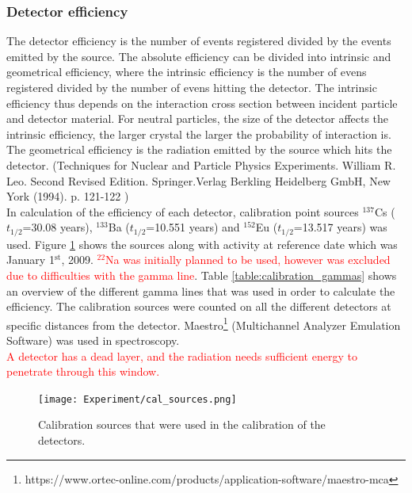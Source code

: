 \subsubsection{Detector efficiency}
The detector efficiency is the number of events registered divided by the events emitted by the source. The absolute efficiency can be divided into intrinsic and geometrical efficiency, where the intrinsic efficiency is the number of evens registered divided by the number of evens hitting the detector. The intrinsic efficiency thus depends on the interaction cross section between incident particle and detector material. For neutral particles, the size of the detector affects the intrinsic efficiency, the larger crystal the larger the probability of interaction is. The geometrical efficiency is the radiation emitted by the source which hits the detector. (Techniques for Nuclear and Particle Physics Experiments. William R. Leo. Second Revised Edition. Springer.Verlag Berkling Heidelberg GmbH, New York (1994). p. 121-122 )\\ 




\noindent 
In calculation of the efficiency of each detector, calibration point sources $^{137}$Cs ($t_{1/2}$=30.08 years), $^{133}$Ba ($t_{1/2}$=10.551 years) and $^{152}$Eu ($t_{1/2}$=13.517 years) was used. Figure \ref{fig:cal_sources} shows the sources along with activity at reference date which was January 1$^{\text{st}}$, 2009. \textcolor{red}{ $^{22}$Na was initially planned to be used, however was excluded due to difficulties with the gamma line}. Table \ref{table:calibration_gammas} shows an overview of the different gamma lines that was used in order to calculate the efficiency. The calibration sources were counted on all the different detectors at specific distances from the detector. Maestro\footnote{https://www.ortec-online.com/products/application-software/maestro-mca} (Multichannel Analyzer Emulation Software) was used in spectroscopy.  \\

\noindent 
\textcolor{red}{
A detector has a dead layer, and the radiation needs sufficient energy to penetrate through this window. }


\begin{figure}
    \centering
    \texttt{[image: Experiment/cal\_sources.png]}
    \caption{Calibration sources that were used in the calibration of the detectors.}
    \label{fig:cal_sources}
\end{figure}

